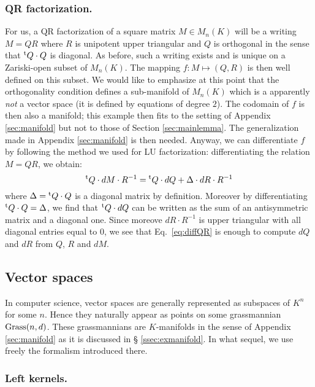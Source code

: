 \documentclass{lms}
\begin{document}
\subsubsection*{QR factorization.}

For us, a QR factorization of a square matrix $M \in M_n(K)$ will be
a writing $M = QR$ where $R$ is unipotent upper triangular and $Q$ is
orthogonal in the sense that ${}^{\text t} Q \cdot Q$ is diagonal. As before, such 
a writing exists and is unique on a Zariski-open subset of $M_n(K)$. The
mapping $f : M \mapsto (Q,R)$ is then well defined on this subset. We 
would like to emphasize at this point that the orthogonality condition
defines a sub-manifold of $M_n(K)$ which is a apparently \emph{not} a
vector space (it is defined by equations of degree $2$). The codomain
of $f$ is then also a manifold; this example then fits to the setting
of Appendix \ref{sec:manifold} but not to those of Section \ref{sec:mainlemma}. 
The generalization made in Appendix \ref{sec:manifold} is then needed.
Anyway, we can differentiate $f$ by following the method we used for LU 
factorization: differentiating the relation $M = QR$, we obtain:
\begin{equation}
\label{eq:diffQR}
{}^{\text t} Q \cdot dM \cdot R^{-1} = {}^{\text t} Q \cdot dQ + \Delta \cdot dR 
\cdot R^{-1}
\end{equation}
where $\Delta = {}^{\text t} Q \cdot Q$ is a diagonal matrix by definition.
Moreover by differentiating ${}^{\text t} Q \cdot Q = \Delta$, we find that
${}^{\text t} Q \cdot dQ$ can be written as the sum of an antisymmetric 
matrix and a diagonal one. Since moreove $dR \cdot R^{-1}$ is upper
triangular with all diagonal entries equal to $0$, we see that 
Eq.~\eqref{eq:diffQR} is enough to compute $dQ$ and $dR$ from $Q$, $R$ 
and $dM$.

\subsection{Vector spaces}

In computer science, vector spaces are generally represented as subspaces 
of $K^n$ for some $n$. Hence they naturally appear as points on some 
grassmannian $\text{\rm Grass}(n,d)$. These grassmannians are $K$-manifolds in the 
sense of Appendix \ref{sec:manifold} as it is discussed in \S 
\ref{ssec:exmanifold}. In what sequel, we use freely the formalism 
introduced there.

\subsubsection*{Left kernels.}
\end{document}
